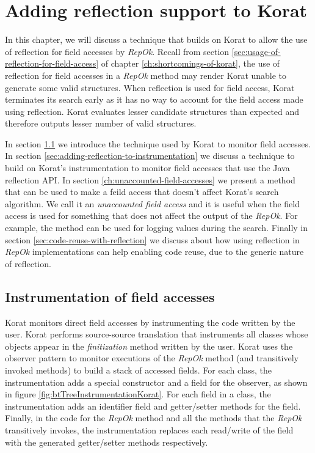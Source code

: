 \chapter{Adding reflection support to Korat}
\label{ch:adding-reflection}
In this chapter, we will discuss a technique that builds on Korat to
allow the use of reflection for field accesses by \emph{RepOk}. Recall
from section \ref{sec:usage-of-reflection-for-field-access} of chapter
\ref{ch:shortcomings-of-korat}, the use of reflection for field
accesses in a \emph{RepOk} method may render Korat unable to generate
some valid structures. When reflection is used for field access, Korat
terminates its search early as it has no way to account for the field
access made using reflection. Korat evaluates lesser candidate
structures than expected and therefore outputs lesser number of valid
structures.

\para In section \ref{sec:instrumentation-of-field-accesses} we
introduce the technique used by Korat to monitor field accesses. In
section \ref{sec:adding-reflection-to-instrumentation} we discuss a
technique to build on Korat's instrumentation to monitor field
accesses that use the Java reflection API. In section
\ref{ch:unaccounted-field-accesses} we present a method that can be
used to make a feild access that doesn't affect Korat's search
algorithm. We call it an \emph{unaccounted field access} and it is
useful when the field access is used for something that does not
affect the output of the \emph{RepOk}. For example, the method can be
used for logging values during the search. Finally in section
\ref{sec:code-reuse-with-reflection} we discuss about how using
reflection in \emph{RepOk} implementations can help enabling code
reuse, due to the generic nature of reflection.

\section{Instrumentation of field accesses}
\label{sec:instrumentation-of-field-accesses}
Korat monitors direct field accesses by instrumenting the code written
by the user. Korat performs source-source translation that instruments
all classes whose objects appear in the \emph{finitization} method
written by the user. Korat uses the observer pattern
\cite{gamma1994design} to monitor executions of the \emph{RepOk}
method (and transitively invoked methods) to build a stack of accessed
fields. For each class, the instrumentation adds a special constructor
and a field for the observer, as shown in figure
\ref{fig:btTreeInstrumentationKorat}. For each field in a class, the
instrumentation adds an identifier field and getter/setter methods for
the field. Finally, in the code for the \emph{RepOk} method and all
the methods that the \emph{RepOk} transitively invokes, the
instrumentation replaces each read/write of the field with the
generated getter/setter methods respectively.

